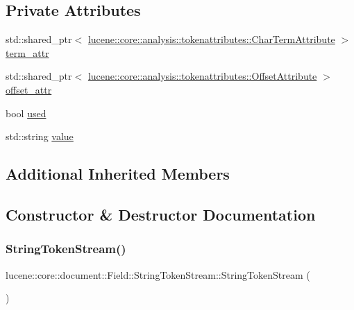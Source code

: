 \subsection*{Private Attributes}
\begin{DoxyCompactItemize}
\item 
std\+::shared\+\_\+ptr$<$ \mbox{\hyperlink{classlucene_1_1core_1_1analysis_1_1tokenattributes_1_1CharTermAttribute}{lucene\+::core\+::analysis\+::tokenattributes\+::\+Char\+Term\+Attribute}} $>$ \mbox{\hyperlink{classlucene_1_1core_1_1document_1_1Field_1_1StringTokenStream_aabbaa8158852b07018168503d8256738}{term\+\_\+attr}}
\item 
std\+::shared\+\_\+ptr$<$ \mbox{\hyperlink{classlucene_1_1core_1_1analysis_1_1tokenattributes_1_1OffsetAttribute}{lucene\+::core\+::analysis\+::tokenattributes\+::\+Offset\+Attribute}} $>$ \mbox{\hyperlink{classlucene_1_1core_1_1document_1_1Field_1_1StringTokenStream_a551065a875bdfd07f13d7af976bb0978}{offset\+\_\+attr}}
\item 
bool \mbox{\hyperlink{classlucene_1_1core_1_1document_1_1Field_1_1StringTokenStream_a52dfe7dde7eebff97018a9ef2e80a460}{used}}
\item 
std\+::string \mbox{\hyperlink{classlucene_1_1core_1_1document_1_1Field_1_1StringTokenStream_aca92e020d7ef40f5515d0d5f1a994700}{value}}
\end{DoxyCompactItemize}
\subsection*{Additional Inherited Members}


\subsection{Constructor \& Destructor Documentation}
\mbox{\label{classlucene_1_1core_1_1document_1_1Field_1_1StringTokenStream_afccecc9c42efd7a2f877f1603dc6fe24}} 
\subsubsection{\texorpdfstring{String\+Token\+Stream()}{StringTokenStream()}}
{\footnotesize\ttfamily lucene\+::core\+::document\+::\+Field\+::\+String\+Token\+Stream\+::\+String\+Token\+Stream (\begin{DoxyParamCaption}{ }\end{DoxyParamCaption})\hspace{0.3cm}{\ttfamily [inline]}}

